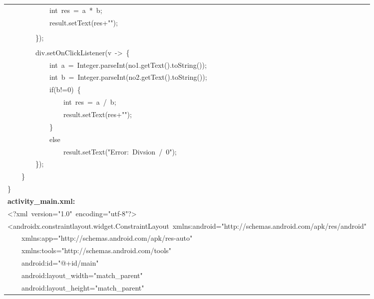 \documentclass[a4paper,12pt]{article}
\begin{document}
\begin{longtable}{|p{}|}
{\ttfamily\small \ \ \ \ \ \ \ \ \ \ \ \ int\ res\ =\ a\ *\ b;} \\
{\ttfamily\small \ \ \ \ \ \ \ \ \ \ \ \ result.setText(res+"");} \\
\strut \\
{\ttfamily\small \ \ \ \ \ \ \ \ \});} \\
\strut \\
{\ttfamily\small \ \ \ \ \ \ \ \ div.setOnClickListener(v\ -\textgreater{}\ \{} \\
{\ttfamily\small \ \ \ \ \ \ \ \ \ \ \ \ int\ a\ =\ Integer.parseInt(no1.getText().toString());} \\
{\ttfamily\small \ \ \ \ \ \ \ \ \ \ \ \ int\ b\ =\ Integer.parseInt(no2.getText().toString());} \\
{\ttfamily\small \ \ \ \ \ \ \ \ \ \ \ \ if(b!=0)\ \{} \\
{\ttfamily\small \ \ \ \ \ \ \ \ \ \ \ \ \ \ \ \ int\ res\ =\ a\ /\ b;} \\
{\ttfamily\small \ \ \ \ \ \ \ \ \ \ \ \ \ \ \ \ result.setText(res+"");} \\
{\ttfamily\small \ \ \ \ \ \ \ \ \ \ \ \ \}} \\
{\ttfamily\small \ \ \ \ \ \ \ \ \ \ \ \ else} \\
{\ttfamily\small \ \ \ \ \ \ \ \ \ \ \ \ \ \ \ \ result.setText("Error:\ Divsion\ /\ 0");} \\
{\ttfamily\small \ \ \ \ \ \ \ \ \});} \\
{\ttfamily\small \ \ \ \ \}} \\
{\ttfamily\small \}} \\
\hline
\rule{0pt}{13pt}\textbf{activity\_main.xml:} \\
\hline
{\ttfamily\small \textless{}?xml\ version="1.0"\ encoding="utf-8"?\textgreater{}} \\
{\ttfamily\small \textless{}androidx.constraintlayout.widget.ConstraintLayout\ xmlns:android="http://schemas.android.com/apk/res/android"} \\
{\ttfamily\small \ \ \ \ xmlns:app="http://schemas.android.com/apk/res-auto"} \\
{\ttfamily\small \ \ \ \ xmlns:tools="http://schemas.android.com/tools"} \\
{\ttfamily\small \ \ \ \ android:id="@+id/main"} \\
{\ttfamily\small \ \ \ \ android:layout\_width="match\_parent"} \\
{\ttfamily\small \ \ \ \ android:layout\_height="match\_parent"} \\

\end{longtable}
\end{document}
